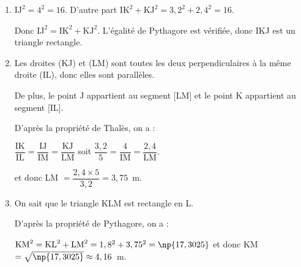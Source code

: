 
\medskip

\begin{enumerate}
\item $\text{IJ}^2 = 4^2 = 16$. D'autre part $\text{IK}^2 + \text{KJ}^2 = 3,2^2 + 2,4^2 = 16$.

Donc $\text{IJ}^2 = \text{IK}^2 + \text{KJ}^2$. L'égalité de Pythagore est vérifiée, donc IKJ est un triangle rectangle.
\item Les droites (KJ) et (LM) sont toutes les deux perpendiculaires à la même droite (IL), donc elles sont parallèles.

De plus, le point J appartient au segment [LM] et le point K appartient au segment [IL].

D'après la propriété de Thalès, on a :

$\dfrac{\text{IK}}{\text{IL}} =  \dfrac{\text{IJ}}{\text{IM}} =  \dfrac{\text{KJ}}{\text{LM}}$ soit  $\dfrac{3,2}{5} = \dfrac{4}{\text{IM}} =  \dfrac{2,4}{\text{LM}}$.

et donc LM $= \dfrac{2,4 \times 5}{3,2} = 3,75$~m.
\item On sait que le triangle KLM est rectangle en L.

D'après la propriété de Pythagore, on a : 

$\text{KM}^2 = \text{KL}^2 + \text{LM}^2 = 1,8^2 + 3,75^2 = \np{17,3025}$
et donc KM $=  \sqrt{\np{17,3025}} \approx  4,16$~m.
\end{enumerate}
 
\vspace{0,5cm}

